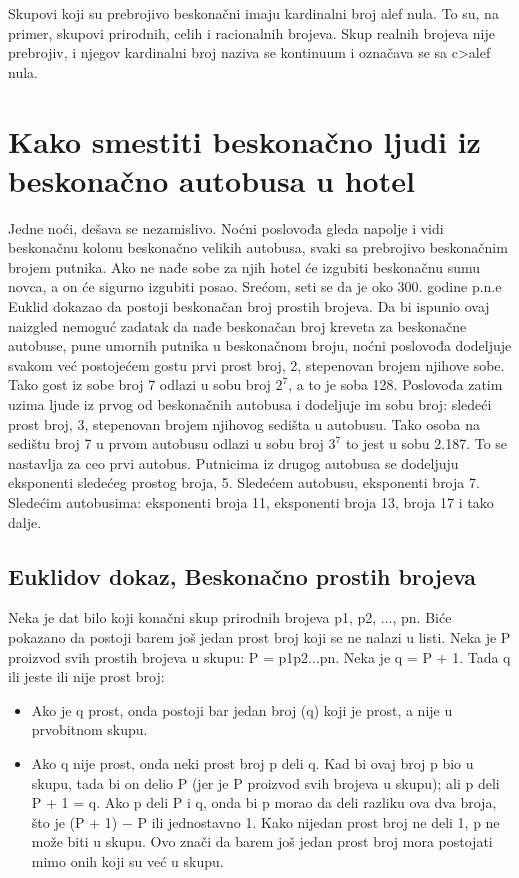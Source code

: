 \documentclass[a4paper]{article}
\begin{document}
Skupovi koji su prebrojivo beskonačni imaju kardinalni broj alef nula.
To su, na primer, skupovi prirodnih, celih i racionalnih brojeva.
Skup realnih brojeva nije prebrojiv, i njegov kardinalni broj naziva se kontinuum i označava se sa c>alef nula.

\newpage

\section{Kako smestiti beskonačno ljudi iz beskonačno autobusa u hotel}
Jedne noći, dešava se nezamislivo. Noćni poslovođa gleda napolje i vidi beskonačnu kolonu beskonačno velikih autobusa, svaki sa prebrojivo beskonačnim brojem putnika. Ako ne nađe sobe za njih hotel će izgubiti beskonačnu sumu novca, a on će sigurno izgubiti posao. Srećom, seti se da je oko 300. godine p.n.e Euklid dokazao da postoji beskonačan broj prostih brojeva. Da bi ispunio ovaj naizgled nemoguć zadatak da nađe beskonačan broj kreveta za beskonačne autobuse, pune umornih putnika u beskonačnom broju, noćni poslovođa dodeljuje svakom već postojećem gostu prvi prost broj, 2, stepenovan brojem njihove sobe. Tako gost iz sobe broj 7 odlazi u sobu broj $2^7$, a to je soba 128. Poslovođa zatim uzima ljude iz prvog od beskonačnih autobusa i dodeljuje im sobu broj: sledeći prost broj, 3, stepenovan brojem njihovog sedišta u autobusu. Tako osoba na sedištu broj 7 u prvom autobusu odlazi u sobu broj $3^7$ to jest u sobu 2.187. To se nastavlja za ceo prvi autobus. Putnicima iz drugog autobusa se dodeljuju eksponenti sledećeg prostog broja, 5. Sledećem autobusu, eksponenti broja 7. Sledećim autobusima: eksponenti broja 11, eksponenti broja 13, broja 17 i tako dalje.

\subsection{Euklidov dokaz, Beskonačno prostih brojeva}
Neka je dat bilo koji konačni skup prirodnih brojeva p1, p2, ..., pn. Biće pokazano da postoji barem još jedan prost broj koji se ne nalazi u listi. Neka je P proizvod svih prostih brojeva u skupu: P = p1p2...pn. Neka je q = P + 1. Tada q ili jeste ili nije prost broj:
\begin{itemize}
\item Ako je q prost, onda postoji bar jedan broj (q) koji je prost, a nije u prvobitnom skupu.
\item Ako q nije prost, onda neki prost broj p deli q. Kad bi ovaj broj p bio u skupu, tada bi on delio P (jer je P proizvod svih brojeva u skupu); ali p deli P + 1 = q. Ako p deli P i q, onda bi p morao da deli razliku
\cite{objasnjenje_deljenja} ova dva broja, što je (P + 1) − P ili jednostavno 1. Kako nijedan prost broj ne deli 1, p ne može biti u skupu. Ovo znači da barem još jedan prost broj mora postojati mimo onih koji su već u skupu.
\end{itemize} 
\end{document}
